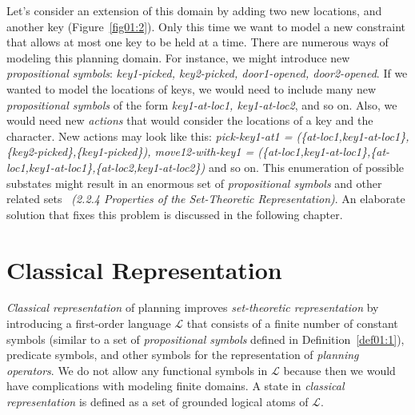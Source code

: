 \begin{example}\label{ex01:2}
    Let's consider an extension of this domain by adding two new locations, and another key (Figure~\ref{fig01:2}). Only this time we want to model a new constraint that allows at most one key to be held at a time. There are numerous ways of modeling this planning domain. For instance, we might introduce new \emph{propositional symbols}: \emph{key1-picked, key2-picked, door1-opened, door2-opened}. If we wanted to model the locations of keys, we would need to include many new \emph{propositional symbols} of the form \emph{key1-at-loc1, key1-at-loc2}, and so on. Also, we would need new \emph{actions} that would consider the locations of a key and the character. New actions may look like this: \emph{pick-key1-at1 = (\{at-loc1,key1-at-loc1\},\{key2-picked\},\{key1-picked\}), move12-with-key1 = (\{at-loc1,key1-at-loc1\},\{at-loc1,key1-at-loc1\},\{at-loc2,key1-at-loc2\})} and so on. This enumeration of possible substates might result in an enormous set of \emph{propositional symbols} and other related sets \emph{\cite{nau}~{(2.2.4 Properties of the Set-Theoretic Representation)}}. An elaborate solution that fixes this problem is discussed in the following chapter.
\end{example}

\section{Classical Representation}\label{class_repre}

\noindent
\emph{Classical representation} of planning improves \emph{set-theoretic representation} by introducing a first-order language $\mathcal{L}$ that consists of a finite number of constant symbols (similar to a set of \emph{propositional symbols} defined in Definition~\ref{def01:1}), predicate symbols, and other symbols for the representation of \emph{planning operators}. We do not allow any functional symbols in $\mathcal{L}$ because then we would have complications with modeling finite domains. A state in \emph{classical representation} is defined as a set of grounded logical atoms of $\mathcal{L}$.

